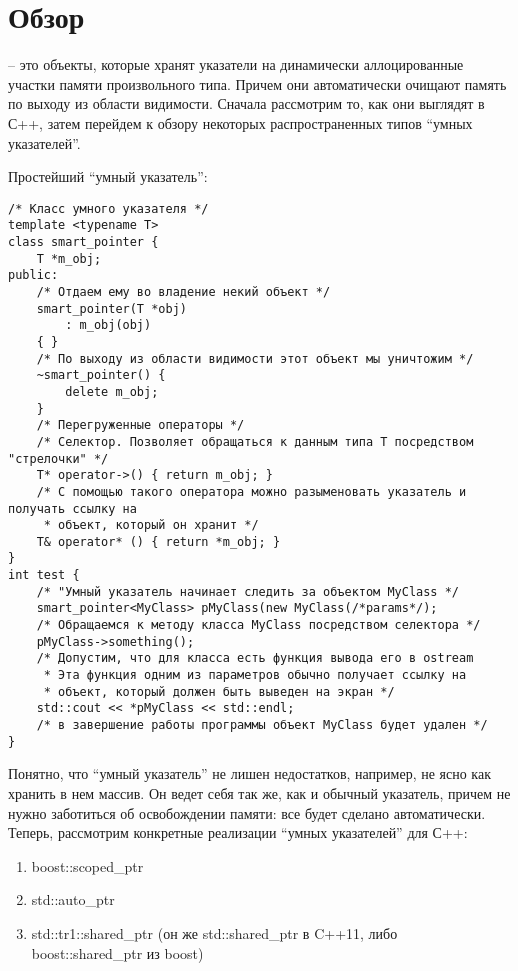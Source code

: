 \section{Обзор}

 -- это объекты, которые хранят указатели на динамически аллоцированные участки памяти произвольного типа. Причем они автоматически очищают память по выходу из области видимости.
Сначала рассмотрим то, как они выглядят в С++, затем перейдем к обзору некоторых распространенных типов ``умных указателей''.

Простейший ``умный указатель'':
\begin{lstlisting}
/* Класс умного указателя */
template <typename T>
class smart_pointer {
    T *m_obj;
public:
    /* Отдаем ему во владение некий объект */
    smart_pointer(T *obj)
        : m_obj(obj)
    { }
    /* По выходу из области видимости этот объект мы уничтожим */
    ~smart_pointer() {
        delete m_obj;
    }
    /* Перегруженные операторы */
    /* Селектор. Позволяет обращаться к данным типа T посредством "стрелочки" */
    T* operator->() { return m_obj; }
    /* С помощью такого оператора можно разыменовать указатель и получать ссылку на
     * объект, который он хранит */
    T& operator* () { return *m_obj; }
}
int test {
    /* "Умный указатель начинает следить за объектом MyClass */
    smart_pointer<MyClass> pMyClass(new MyClass(/*params*/);    
    /* Обращаемся к методу класса MyClass посредством селектора */
    pMyClass->something();    
    /* Допустим, что для класса есть функция вывода его в ostream
     * Эта функция одним из параметров обычно получает ссылку на 
     * объект, который должен быть выведен на экран */
    std::cout << *pMyClass << std::endl;    
    /* в завершение работы программы объект MyClass будет удален */
}

\end{lstlisting}

Понятно, что ``умный указатель'' не лишен недостатков, например, не ясно как хранить в нем массив. Он ведет себя так же, как и обычный указатель, причем не нужно заботиться об освобождении памяти: все будет сделано автоматически.
Теперь, рассмотрим конкретные реализации ``умных указателей'' для С++:

\begin{enumerate}
\item boost::scoped_ptr
\item std::auto_ptr
\item std::tr1::shared_ptr (он же std::shared_ptr в C++11, либо boost::shared_ptr из boost)
\end {enumerate}

